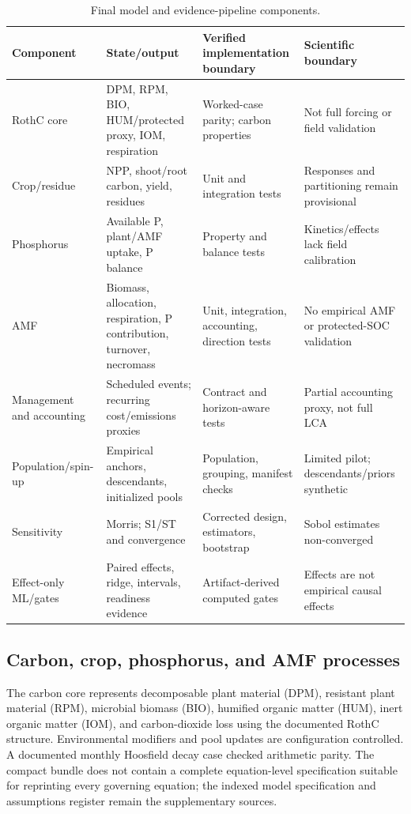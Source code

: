 \documentclass[11pt]{article}
\begin{document}
\begin{table}[H]
\centering
\caption{Final model and evidence-pipeline components.}
\label{tab:components}
\scriptsize
\begin{tabularx}{\textwidth}{P{0.14\textwidth}P{0.23\textwidth}Y Y}
\toprule
Component & State/output & Verified implementation boundary & Scientific boundary \\
\midrule
RothC core & DPM, RPM, BIO, HUM/protected proxy, IOM, respiration & Worked-case parity; carbon properties & Not full forcing or field validation \\
Crop/residue & NPP, shoot/root carbon, yield, residues & Unit and integration tests & Responses and partitioning remain provisional \\
Phosphorus & Available P, plant/AMF uptake, P balance & Property and balance tests & Kinetics/effects lack field calibration \\
AMF & Biomass, allocation, respiration, P contribution, turnover, necromass & Unit, integration, accounting, direction tests & No empirical AMF or protected-SOC validation \\
Management and accounting & Scheduled events; recurring cost/emissions proxies & Contract and horizon-aware tests & Partial accounting proxy, not full LCA \\
Population/spin-up & Empirical anchors, descendants, initialized pools & Population, grouping, manifest checks & Limited pilot; descendants/priors synthetic \\
Sensitivity & Morris; S1/ST and convergence & Corrected design, estimators, bootstrap & Sobol estimates non-converged \\
Effect-only ML/gates & Paired effects, ridge, intervals, readiness evidence & Artifact-derived computed gates & Effects are not empirical causal effects \\
\bottomrule
\end{tabularx}
\end{table}

\subsection{Carbon, crop, phosphorus, and AMF processes}

The carbon core represents decomposable plant material (DPM), resistant plant material (RPM), microbial biomass (BIO), humified organic matter (HUM), inert organic matter (IOM), and carbon-dioxide loss using the documented RothC structure. Environmental modifiers and pool updates are configuration controlled. A documented monthly Hoosfield decay case checked arithmetic parity. The compact bundle does not contain a complete equation-level specification suitable for reprinting every governing equation; the indexed model specification and assumptions register remain the supplementary sources.
\end{document}

